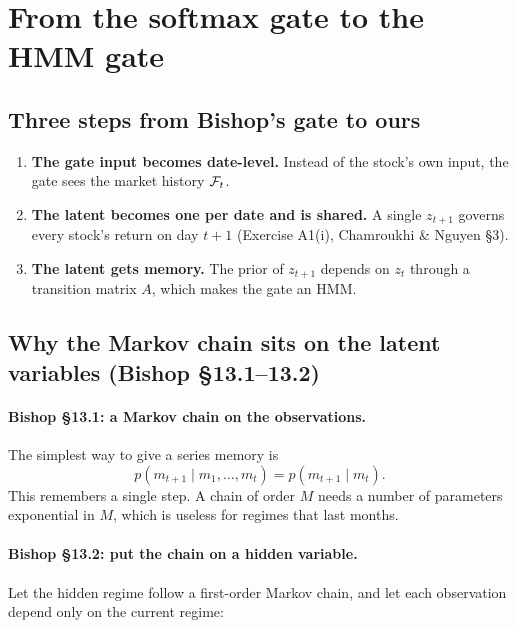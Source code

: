 \section{From the softmax gate to the HMM gate}

\subsection{Three steps from Bishop's gate to ours}
\begin{enumerate}
  \item \textbf{The gate input becomes date-level.} Instead of the stock's own input, the gate sees the market history $\mathcal{F}_t$.
  \item \textbf{The latent becomes one per date and is shared.} A single $z_{t+1}$ governs every stock's return on day $t+1$ (Exercise A1(i), Chamroukhi \& Nguyen \S3).
  \item \textbf{The latent gets memory.} The prior of $z_{t+1}$ depends on $z_t$ through a transition matrix $A$, which makes the gate an HMM.
\end{enumerate}

\subsection{Why the Markov chain sits on the latent variables (Bishop \S13.1--13.2)}

\paragraph{Bishop \S13.1: a Markov chain on the observations.} The simplest way to give a series memory is
\begin{equation}
p(m_{t+1}\mid m_1,\dots,m_t)=p(m_{t+1}\mid m_t).
\end{equation}
This remembers a single step. A chain of order $M$ needs a number of parameters exponential in $M$, which is useless for regimes that last months.

\paragraph{Bishop \S13.2: put the chain on a hidden variable.} Let the hidden regime follow a first-order Markov chain, and let each observation depend only on the current regime:

\begin{center}
\end{center}

